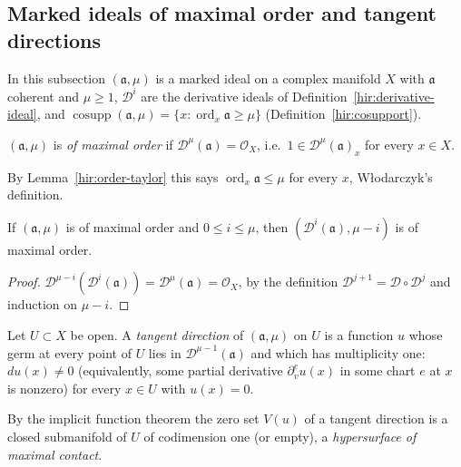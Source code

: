 \subsection{Marked ideals of maximal order and tangent directions}

In this subsection \((\mathfrak a,\mu)\) is a marked ideal on a complex manifold \(X\) with \(\mathfrak a\) coherent and \(\mu\ge1\),
\(\mathcal D^i\) are the derivative ideals of Definition~\ref{hir:derivative-ideal}, and
\(\operatorname{cosupp}(\mathfrak a,\mu)=\{x:\operatorname{ord}_x\mathfrak a\ge\mu\}\) (Definition~\ref{hir:cosupport}).

\begin{definition}
\label{mc:maximal-order}
\leanok
\((\mathfrak a,\mu)\) is \emph{of maximal order} if \(\mathcal D^\mu(\mathfrak a)=\mathcal O_X\), i.e.\ \(1\in\mathcal D^\mu(\mathfrak a)_x\) for every
\(x\in X\).
\end{definition}
By Lemma~\ref{hir:order-taylor} this says \(\operatorname{ord}_x\mathfrak a\le\mu\) for every \(x\), Włodarczyk's definition.

\begin{lemma}
\label{mc:maximal-order-derivative}
\leanok
If \((\mathfrak a,\mu)\) is of maximal order and \(0\le i\le\mu\), then \((\mathcal D^i(\mathfrak a),\mu-i)\) is of maximal order.
\end{lemma}
\begin{proof}
\leanok
\(\mathcal D^{\mu-i}(\mathcal D^i(\mathfrak a))=\mathcal D^\mu(\mathfrak a)=\mathcal O_X\), by the definition \(\mathcal D^{j+1}=\mathcal D\circ\mathcal D^j\) and induction on
\(\mu-i\).
\end{proof}

\begin{definition}
\label{mc:tangent-direction}
\leanok
Let \(U\subset X\) be open. A \emph{tangent direction} of \((\mathfrak a,\mu)\) on \(U\) is a function \(u\) whose germ at every
point of \(U\) lies in \(\mathcal D^{\mu-1}(\mathfrak a)\) and which has multiplicity one: \(du(x)\ne0\) (equivalently, some partial
derivative \(\partial^e_vu(x)\) in some chart \(e\) at \(x\) is nonzero) for every \(x\in U\) with \(u(x)=0\).
\end{definition}
By the implicit function theorem the zero set \(V(u)\) of a tangent direction is a closed submanifold of \(U\) of codimension
one (or empty), a \emph{hypersurface of maximal contact}.

